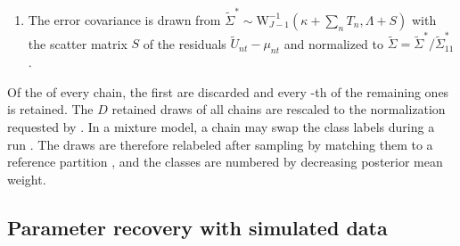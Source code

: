 \documentclass[article,shortnames]{jss}
\begin{document}
\begin{enumerate}
unordered choice are $\mathrm{N}_{J-1}(\mu_{nt}, \tilde{\Sigma})$ truncated to
the region in which the chosen alternative has the largest utility, and the
truncated normal draws use the samplers of \citet{Robert1995}. For a ranked
response, the truncation is chosen such that the observed ranking holds. An
ordered response has a single utility $U_{nt} = \mu_{nt} + \varepsilon_{nt}$
with $\varepsilon_{nt} \sim \mathrm{N}(0, 1)$, drawn from
$\mathrm{N}(\mu_{nt}, 1)$ truncated to $(\gamma_{y_{nt} - 1}, \gamma_{y_{nt}}]$.
\item The error covariance is drawn from $\tilde{\Sigma}^\ast \sim
\mathrm{W}^{-1}_{J-1}(\kappa + \sum_n T_n, \Lambda + S)$ with the scatter matrix
$S$ of the residuals $\tilde{U}_{nt} - \mu_{nt}$ and normalized to
$\tilde{\Sigma} = \tilde{\Sigma}^\ast / \tilde{\Sigma}^\ast_{11}$.
\end{enumerate}

Of the  of every chain, the first  are discarded
and every -th of the remaining ones is retained. The $D$ retained
draws of all chains are rescaled to the normalization requested by .
In a mixture model, a chain may swap the class labels during a run
\citep{Stephens2000}. The draws are therefore relabeled after sampling by
matching them to a reference partition \citep{Dahl2006, Papastamoulis2010}, and
the classes are numbered by decreasing posterior mean weight.

\subsection{Parameter recovery with simulated data} \label{sec:fit_simulation}
\end{document}
